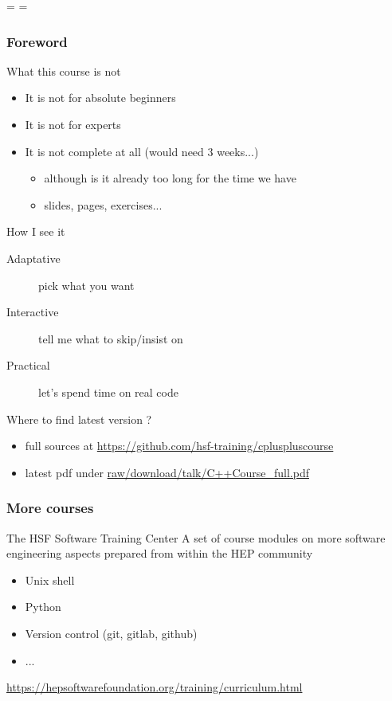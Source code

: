 \documentclass[compress]{beamer}
\begin{document}
\showboxdepth=\maxdimen
\showboxbreadth=\maxdimen

\begin{frame}
  \titlepage
\end{frame}

\begin{frame}
  \frametitle{Foreword}
  \begin{block}{What this course is not}
    \begin{itemize}
    \item It is not for absolute beginners
    \item It is not for experts
    \item It is not complete at all (would need 3 weeks...)
      \begin{itemize}
      \item although is it already too long for the time we have
      \item \inserttotalframenumber{} slides, \insertpresentationendpage{} pages,  exercises...
      \end{itemize}
    \end{itemize}
  \end{block}
  \begin{block}{How I see it}
    \begin{description}
    \item[Adaptative] pick what you want
    \item[Interactive] tell me what to skip/insist on
    \item[Practical] let's spend time on real code
    \end{description}
  \end{block}
  \begin{block}{Where to find latest version ?}
    \begin{itemize}
    \item full sources at {\scriptsize \url{https://github.com/hsf-training/cpluspluscourse}}
    \item latest pdf under {\scriptsize \href{https://github.com/hsf-training/cpluspluscourse/raw/download/talk/C++Course\_full.pdf}{raw/download/talk/C++Course\_full.pdf}}
    \end{itemize}
  \end{block}
\end{frame}


\begin{frame}
  \frametitle{More courses}
  \begin{block}{The HSF Software Training Center}
    A set of course modules on more software engineering aspects prepared from within the HEP community
    \begin{itemize}
      \item Unix shell
      \item Python
      \item Version control (git, gitlab, github)
      \item ...
    \end{itemize}
    {\small \url{https://hepsoftwarefoundation.org/training/curriculum.html}}
  \end{block}

\end{frame}
\end{document}
